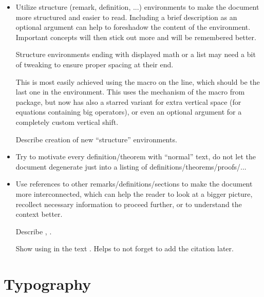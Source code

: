 \begin{itemize}
    \item Utilize structure (remark, definition, ...) environments to make the document more structured and easier to read.
          Including a brief description as an optional argument can help to foreshadow the content of the environment.
          Important concepts will then stick out more and will be remembered better.
          \begin{remark}
              Structure environments ending with displayed math or a list may need a bit of tweaking to ensure proper spacing at their end.

              This is most easily achieved using the \custommacro{\qedhere} macro on the line, which should be the last one in the environment.
              This uses the mechanism of the \macro{\qedhere} macro from  package, but now has also a starred variant for extra vertical space (for equations containing big operators), or even an optional argument for a completely custom vertical shift.
          \end{remark}
          \begin{Todo}
              Describe creation of new \enquote{structure} environments.
          \end{Todo}
    \item Try to motivate every definition/theorem with \enquote{normal} text, do not let the document degenerate just into a listing of definitions/theorems/proofs/...
    \item Use references to other remarks/definitions/sections to make the document more interconnected, which can help the reader to look at a bigger picture, recollect necessary information to proceed further, or to understand the context better.
          \begin{Todo}
              Describe \custommacro{\Cref}, \custommacro{\Nref}.
          \end{Todo}
          \begin{Todo}
              Show using  in the text \autocite{TODO}.
              Helps to not forget to add the citation later.
          \end{Todo}
\end{itemize}


\section{Typography}%
\label{sec:Typography}

